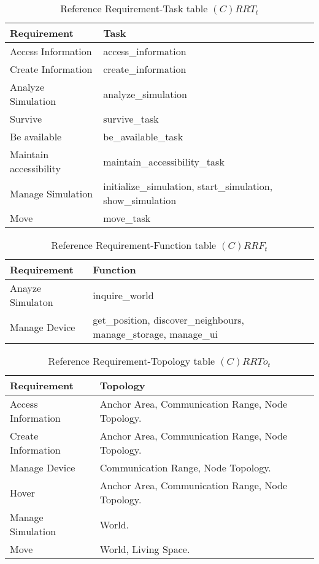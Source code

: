 \begin{table}[H]
	\centering
	\begin{tabular}{|p{4cm}|p{8cm}|}
			\hline
			\textbf{Requirement} & \textbf{Task} \\
			\hline
			Access Information & access\_information \\
			\hline
			Create Information & create\_information \\
			\hline
			Analyze Simulation & analyze\_simulation \\
			\hline
			Survive & survive\_task \\
			\hline
			Be available & be\_available\_task \\
			\hline
			Maintain accessibility & maintain\_accessibility\_task\\
			\hline
			Manage Simulation & initialize\_simulation, start\_simulation,
			show\_simulation \\
			\hline
			Move & move\_task \\
			\hline
		\end{tabular}
	\caption{Reference Requirement-Task table $(C)RRT_t$}
	\label{tab:crrtt}
\end{table}

\begin{table}[H]
	\centering
	\begin{tabular}{|p{4cm}|p{8cm}|}
			\hline
			\textbf{Requirement} & \textbf{Function} \\
			\hline
			Anayze Simulaton & inquire\_world \\
			\hline
			Manage Device & get\_position, discover\_neighbours, manage\_storage, manage\_ui \\
			\hline
		\end{tabular}
	\caption{Reference Requirement-Function table $(C)RRF_t$}
	\label{tab:crrft}
\end{table}

\begin{table}[H]
	\centering
	\begin{tabular}{|p{4cm}|p{8cm}|}
			\hline
			\textbf{Requirement} & \textbf{Topology} \\
			\hline
			Access Information & Anchor Area, Communication Range, Node Topology. \\
			\hline
			Create Information & Anchor Area, Communication Range, Node Topology. \\
			\hline
			Manage Device & Communication Range, Node Topology. \\
			\hline
			Hover & Anchor Area, Communication Range, Node Topology. \\
			\hline
			Manage Simulation & World. \\
			\hline
			Move & World, Living Space. \\
			\hline
		\end{tabular}
	\caption{Reference Requirement-Topology table $(C)RRTo_t$}
	\label{tab:crrtot}
\end{table}

